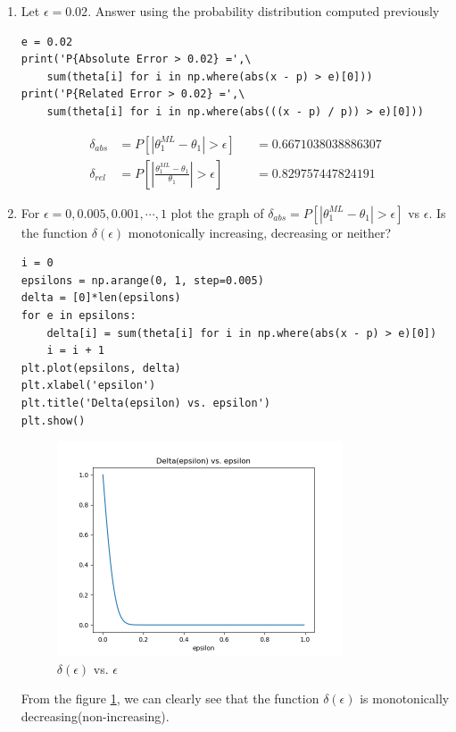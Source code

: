 \documentclass[preprint,12pt]{elsarticle}
\begin{document}
\begin{enumerate}
    \item Let $\epsilon=0.02$. Answer using the probability distribution computed
    previously
    \begin{lstlisting}
e = 0.02
print('P{Absolute Error > 0.02} =',\
    sum(theta[i] for i in np.where(abs(x - p) > e)[0]))
print('P{Related Error > 0.02} =',\
    sum(theta[i] for i in np.where(abs(((x - p) / p)) > e)[0]))
    \end{lstlisting}
    \begin{align*}
        \delta_{abs} &= P[|\theta_1^{ML} - \theta_1| > \epsilon] &&= 0.6671038038886307 \\
        \delta_{rel} &= P[|\frac{\theta_1^{ML} - \theta_1}{\theta_1}| > \epsilon] &&= 0.829757447824191 
    \end{align*}
    
    \item For $\epsilon = 0, 0.005, 0.001,\cdots, 1$ plot the graph of 
    $\delta_{abs} = P[|\theta_1^{ML} - \theta_1| > \epsilon]$ vs $\epsilon$.
    Is the function $\delta(\epsilon)$ monotonically increasing, decreasing or neither?
    \begin{lstlisting}
i = 0
epsilons = np.arange(0, 1, step=0.005)
delta = [0]*len(epsilons)
for e in epsilons:
    delta[i] = sum(theta[i] for i in np.where(abs(x - p) > e)[0])
    i = i + 1
plt.plot(epsilons, delta)
plt.xlabel('epsilon')
plt.title('Delta(epsilon) vs. epsilon')
plt.show()
    \end{lstlisting}
    \begin{figure}[h]
        \center
        \includegraphics[width=0.8\textwidth]{5.png}
        \caption{$\delta(\epsilon)$ vs. $\epsilon$}
        \label{fig:3}
    \end{figure}

    From the figure \ref{fig:3}, we can clearly see that the function
    $\delta(\epsilon)$ is monotonically decreasing(non-increasing).


\end{enumerate}
\end{document}
